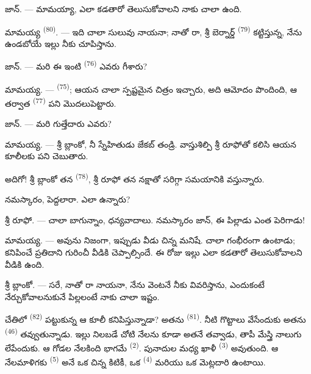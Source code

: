\VUsaut{6.0mm}
\VUsaut{1.4mm}
\VUsaut{2.2mm}

\VUsaut{3.0mm}

\textsc{జాన్}. --- మామయ్యా,  ఎలా కడతారో తెలుసుకోవాలని నాకు చాలా ఉంది.

\textsc{మామయ్య} \textsuperscript{(80)}. --- ఇది చాలా సులువు నాయనా; నాతో రా, శ్రీ బెర్నార్డ్
\textsuperscript{(79)} కట్టిస్తున్న, నేను ఉండబోయే ఇల్లు నీకు చూపిస్తాను.

\textsc{జాన్}. --- మరి ఈ ఇంటి  \textsuperscript{(76)} ఎవరు గీశారు?

\textsc{మామయ్య}. ---  \textsuperscript{(75)}; ఆయన చాలా స్పష్టమైన చిత్రం
ఇచ్చారు, అది ఆమోదం పొందింది, ఆ తర్వాత  \textsuperscript{(77)} పని
మొదలుపెట్టారు.

\textsc{జాన్}. --- మరి గుత్తేదారు ఎవరు?

\textsc{మామయ్య}. --- శ్రీ బ్లాంకో, నీ స్నేహితుడు జేకబ్ తండ్రి. వాస్తుశిల్పి శ్రీ రూఫోతో కలిసి
ఆయన కూలీలకు పని చెబుతారు.

అదిగో! శ్రీ బ్లాంకో తన  \textsuperscript{(78)}, శ్రీ రూఫో తన నక్షాతో సరిగ్గా
సమయానికి వస్తున్నారు.

నమస్కారం, పెద్దలారా. ఎలా ఉన్నారు?

\textsc{శ్రీ రూఫో}. --- చాలా బాగున్నాం, ధన్యవాదాలు. నమస్కారం జాన్, ఈ పిల్లాడు ఎంత పెరిగాడు!

\textsc{మామయ్య}. --- అవును నిజంగా, ఇప్పుడు వీడు చిన్న మనిషే. చాలా గంభీరంగా ఉంటాడు; కనిపించే
ప్రతిదాని గురించీ వీడికి చెప్పాల్సిందే. ఈ రోజు ఇల్లు ఎలా కడతారో తెలుసుకోవాలని వీడికి ఉంది.

\VUsaut{3.0mm}

\textsc{శ్రీ బ్లాంకో}. --- సరే, నాతో రా నాయనా, నేను వెంటనే నీకు వివరిస్తాను, ఎందుకంటే
నేర్చుకోవాలనుకునే పిల్లలంటే నాకు చాలా ఇష్టం.

చేతిలో  \textsuperscript{(82)} పట్టుకున్న ఆ కూలీ కనిపిస్తున్నాడా? అతను
 \textsuperscript{(81)}. నీటి గొట్టాలు వేసేందుకు అతను 
\textsuperscript{(46)} తవ్వుతున్నాడు. ఇల్లు నిలబడే చోటి నేలను కూడా అతనే తవ్వాడు, తాపీ మేస్త్రి
నాలుగు  లేపేందుకు. ఆ గోడల నేలకింది భాగమే  \textsuperscript{(2)}.
పునాదుల మధ్య ఖాళీ  \textsuperscript{(3)} అవుతుంది. ఆ నేలమాళిగకు
 \textsuperscript{(5)} అనే ఒక చిన్న కిటికీ, ఒక 
\textsuperscript{(4)} మరియు ఒక మెట్లదారి ఉంటాయి.

